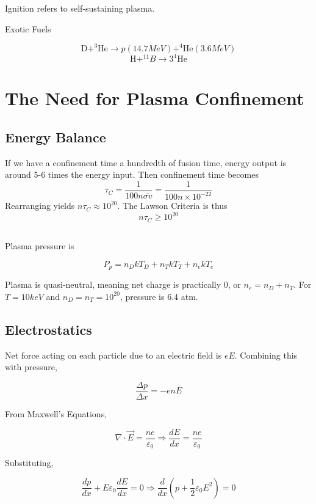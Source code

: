 \documentclass[12pt]{article}
\begin{document}
\begin{defn}[Ignition]
    Ignition refers to self-sustaining plasma.
\end{defn}

Exotic Fuels

$$\text{D} + ^3\text{He} \rightarrow p(14.7\unit{MeV}) + ^4\text{He}(3.6\unit{MeV})$$
$$\text{H} + ^{11}B \rightarrow 3^4\text{He}$$

\section{The Need for Plasma Confinement}

\subsection{Energy Balance}

If we have a confinement time a hundredth of fusion time, energy output is around 5-6 times the energy input. Then confinement time becomes
$$\tau_C = \frac{1}{100n\overline{\sigma v}} = \frac{1}{100n\times10^{-22}}$$
Rearranging yields $n\tau_C \approx 10^{20}$. The Lawson Criteria is thus
$$n\tau_C \geq 10^{20}$$

\subsection{}

Plasma pressure is

$$P_p = n_DkT_D + n_TkT_T + n_ekT_e$$

Plasma is quasi-neutral, meaning net charge is practically 0, or $n_e = n_D + n_T$. For $T=10\unit{keV}$ and $n_D=n_T=10^{20}$, pressure is 6.4 atm.

\subsection{Electrostatics}

Net force acting on each particle due to an electric field is $eE$. Combining this with pressure,

$$\frac{\Delta p}{\Delta x} = -enE$$

From Maxwell's Equations,

$$\nabla \cdot \vec E = \frac{ne}{\varepsilon_0} \Rightarrow \frac{dE}{dx} = \frac{ne}{\varepsilon_0}$$

Substituting,

$$\frac{dp}{dx} + E\varepsilon_0\frac{dE}{dx} = 0 \Rightarrow \frac{d}{dx}\left(p + \frac{1}{2} \varepsilon_0 E^2\right) = 0$$
\end{document}
